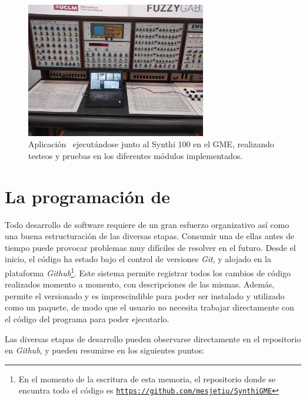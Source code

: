 \begin{figure}
	\centering
	\includegraphics[width=0.7\textwidth]{Synthi_Synthi}
	\caption[Aplicación \appName~ejecutándose junto al Synthi 100 en el GME]{Aplicación \appName~ejecutándose junto al Synthi 100 en el GME, realizando testeos y pruebas en los diferentes módulos implementados.}
	\label{fig:Synthi_Synthi}
\end{figure}

\section[La programación\dots]{La programación de \appName {}}

Todo desarrollo de software requiere de un gran esfuerzo organizativo así como una buena estructuración de las diversas etapas. Consumir una de ellas antes de tiempo puede provocar problemas muy difíciles de resolver en el futuro. Desde el inicio, el código ha estado bajo el control de versiones \textit{Git}, y alojado en la plataforma \textit{Github}\footnote{En el momento de la escritura de esta memoria, el repositorio donde se encuntra todo el código es \href{https://github.com/mesjetiu/SynthiGME}{\texttt{https://github.com/mesjetiu/SynthiGME}}}. Este sistema permite registrar todos los cambios de código realizados momento a momento, con descripciones de las mismas. Además, permite el versionado y es imprescindible para poder ser instalado y utilizado como un paquete, de modo que el usuario no necesita trabajar directamente con el código del programa para poder ejecutarlo.

Las diversas etapas de desarrollo pueden observarse directamente en el repositorio en \textit{Github}, y pueden resumirse en los siguientes puntos:

